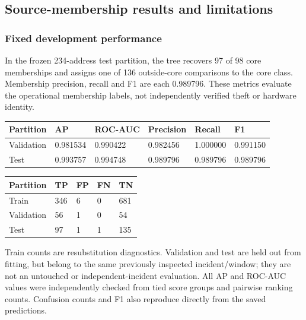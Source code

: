 \begingroup
\setlength{\emergencystretch}{2em}
\hypertarget{source-membership-results-and-limitations}{%
\subsection{Source-membership results and
limitations}\label{source-membership-results-and-limitations}}

\hypertarget{fixed-development-performance}{%
\subsubsection{Fixed development
performance}\label{fixed-development-performance}}

In the frozen 234-address test partition, the tree recovers 97 of 98
core memberships and assigns one of 136 outside-core comparisons to the
core class. Membership precision, recall and F1 are each 0.989796. These
metrics evaluate the operational membership labels, not independently
verified theft or hardware identity.

\begin{longtable}[]{@{}llllll@{}}
\toprule\noalign{}
Partition & AP & ROC-AUC & Precision & Recall & F1 \\
\midrule\noalign{}
\endhead
\bottomrule\noalign{}
\endlastfoot
Validation & 0.981534 & 0.990422 & 0.982456 & 1.000000 & 0.991150 \\
Test & 0.993757 & 0.994748 & 0.989796 & 0.989796 & 0.989796 \\
\end{longtable}

\begin{longtable}[]{@{}lllll@{}}
\toprule\noalign{}
Partition & TP & FP & FN & TN \\
\midrule\noalign{}
\endhead
\bottomrule\noalign{}
\endlastfoot
Train & 346 & 6 & 0 & 681 \\
Validation & 56 & 1 & 0 & 54 \\
Test & 97 & 1 & 1 & 135 \\
\end{longtable}

Train counts are resubstitution diagnostics. Validation and test are
held out from fitting, but belong to the same previously inspected
incident/window; they are not an untouched or independent-incident
evaluation. All AP and ROC-AUC values were independently checked from
tied score groups and pairwise ranking counts. Confusion counts and F1
also reproduce directly from the saved predictions.

